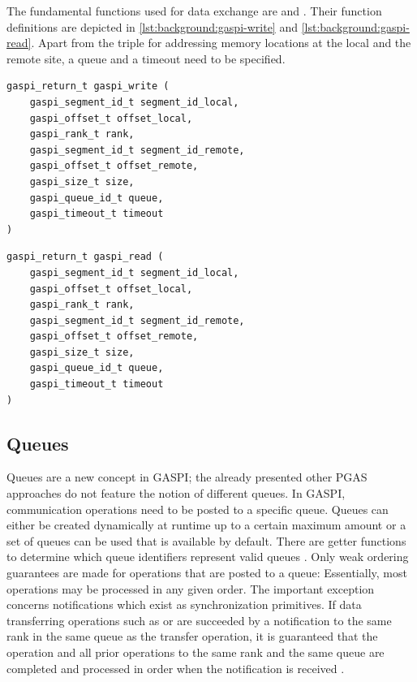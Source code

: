 The fundamental functions used for data exchange are  and  \cite[ch.~8.2]{gaspi-std}. Their function definitions are depicted in \autoref{lst:background:gaspi-write} and \autoref{lst:background:gaspi-read}. Apart from the triple for addressing memory locations at the local and the remote site, a queue and a timeout need to be specified. 

\begin{lstlisting}[style=cpp,captionpos={b},caption={Function definition of \code{gaspi\_write} {\cite[ch.~8.2.1]{gaspi-std}}.},label=lst:background:gaspi-write]
gaspi_return_t gaspi_write ( 
	gaspi_segment_id_t segment_id_local,
	gaspi_offset_t offset_local,
	gaspi_rank_t rank,
	gaspi_segment_id_t segment_id_remote,
	gaspi_offset_t offset_remote,
	gaspi_size_t size,
	gaspi_queue_id_t queue,
	gaspi_timeout_t timeout
)
\end{lstlisting}

\begin{lstlisting}[style=cpp,captionpos={b},caption={Function definition of \code{gaspi\_read} {\cite[ch.~8.2.2]{gaspi-std}}.},label=lst:background:gaspi-read]
gaspi_return_t gaspi_read ( 
	gaspi_segment_id_t segment_id_local,
	gaspi_offset_t offset_local,
	gaspi_rank_t rank,
	gaspi_segment_id_t segment_id_remote,
	gaspi_offset_t offset_remote,
	gaspi_size_t size,
	gaspi_queue_id_t queue,
	gaspi_timeout_t timeout 
)
\end{lstlisting}

\subsection{Queues}

Queues are a new concept in \ac{GASPI}; the already presented other \ac{PGAS} approaches do not feature the notion of different queues. In \ac{GASPI}, communication operations need to be posted to a specific queue. Queues can either be created dynamically at runtime up to a certain maximum amount or a set of queues can be used that is available by default. There are getter functions to determine which queue identifiers represent valid queues \cite[ch.~6.5.1]{gaspi-std}. Only weak ordering guarantees are made for operations that are posted to a queue: Essentially, most operations may be processed in any given order. The important exception concerns notifications which exist as synchronization primitives. If data transferring operations such as  or  are succeeded by a notification to the same rank in the same queue as the transfer operation, it is guaranteed that the operation and all prior operations to the same rank and the same queue are completed and processed in order when the notification is received \cite[ch.~8.3.2]{gaspi-std}.

